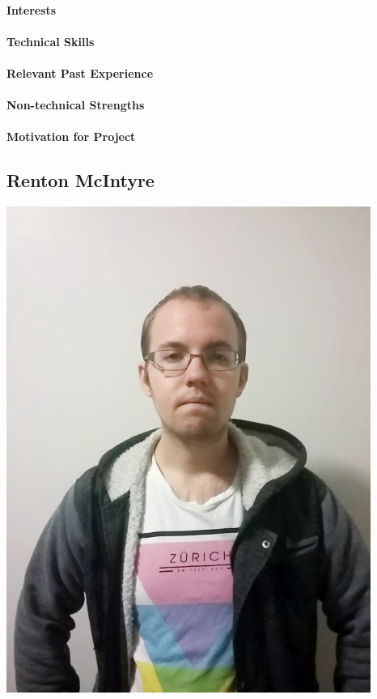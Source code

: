 \documentclass[12pt]{article}
\begin{document}
\paragraph{Interests}
\paragraph{Technical Skills}
\paragraph{Relevant Past Experience}
\paragraph{Non-technical Strengths}
\paragraph{Motivation for Project}

\subsection{Renton McIntyre}
\includegraphics[scale=0.02]{Renton}
\end{document}
